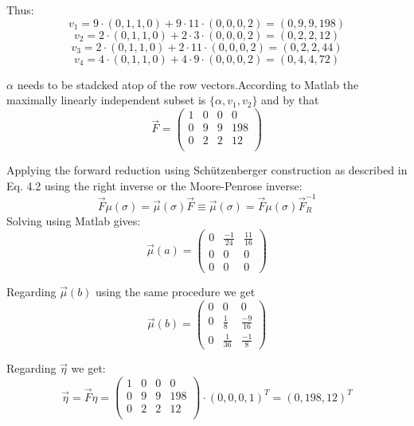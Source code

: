         Thus:
        \[ v_1 = 9 \cdot (0,1,1,0) + 9 \cdot 11 \cdot (0,0,0,2) = (0,9,9,198) \]
        \[ v_2 = 2 \cdot (0,1,1,0) + 2 \cdot 3 \cdot (0,0,0,2) = (0,2,2,12) \]
        \[ v_3 = 2 \cdot (0,1,1,0) + 2 \cdot 11 \cdot (0,0,0,2) = (0,2,2,44) \]
        \[ v_4 = 4 \cdot (0,1,1,0) + 4 \cdot 9 \cdot (0,0,0,2) = (0,4,4,72) \]
        
        $\alpha$ needs to be stadcked atop of the row vectors.According to Matlab the maximally linearly independent subset is $\{\alpha, v_1, v_2\}$ and by that
        \[ \overrightarrow{F} = \begin{pmatrix}
                                    1 & 0 & 0 & 0 \\
                                    0 & 9 & 9 & 198 \\
                                    0 & 2 & 2 & 12  \\
                                \end{pmatrix}
        \]
        
        Applying the forward reduction using Schützenberger construction as described in \autocite{Kiefer2013OnTC} Eq. 4.2 using the right inverse or the Moore-Penrose inverse:
        \[ \overrightarrow{F} \mu(\sigma) = \overrightarrow{\mu}(\sigma)\overrightarrow{F} \equiv \overrightarrow{\mu}(\sigma) = \overrightarrow{F} \mu(\sigma) \overrightarrow{F}^{-1}_R \]
        Solving using Matlab gives:
        \[
        \overrightarrow{\mu}(a) = 
        \begin{pmatrix}
            0 & \frac{-1}{24} & \frac{11}{16} \\
            0 & 0 & 0 \\
            0 & 0 & 0
        \end{pmatrix}
       \]
        
            
        Regarding $\overrightarrow{\mu}(b)$ using the same procedure we get
        \[ \overrightarrow{\mu}(b) = 
            \begin{pmatrix}
                0 & 0 & 0 \\
                0 & \frac{1}{8}& \frac{-9}{16} \\
                0 & \frac{1}{36} & \frac{-1}{8}
            \end{pmatrix}
        \] 
        
        Regarding $\overrightarrow{\eta}$ we get:
        \[ \overrightarrow{\eta} = \overrightarrow{F} \eta =  \begin{pmatrix}
                                    1 & 0 & 0 & 0 \\
                                    0 & 9 & 9 & 198 \\
                                    0 & 2 & 2 & 12  \\
                                \end{pmatrix} \cdot (0,0,0,1)^T = (0, 198, 12)^T \]
            
